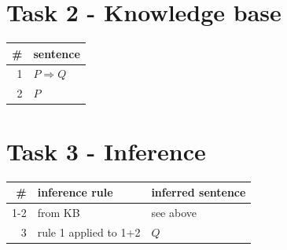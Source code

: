 \documentclass[10pt]{article}
\renewcommand{\implies}{\Rightarrow}
\begin{document}
\section*{Task 2 - Knowledge base}
\begin{tabular}{r|l}
\# & sentence \\
\hline
1 & $P \implies Q$ \\
2 & $P$ \\
\end{tabular} 

\section*{Task 3 - Inference}
\begin{tabular}{r|l|l}
\# & inference rule & inferred sentence \\
\hline
1-2 & from KB & see above \\
3 & rule 1 applied to 1+2 & $Q$ \\
\end{tabular} 
\end{document}
